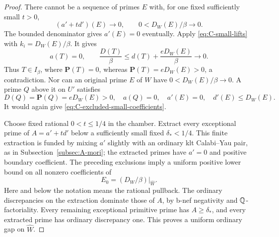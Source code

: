 \begin{proof}
There cannot be a sequence of primes $E$ with, for one fixed sufficiently
small $t>0$,
\begin{equation}\label{eq:C-excluded-small-coefficients}
 (a'+td')(E)\longrightarrow0,
 \qquad 0<D_W(E)/\beta\longrightarrow0.
\end{equation}
The bounded denominator gives $a'(E)=0$ eventually.  Apply
\eqref{eq:C-small-lifts} with $k_i=D_W(E)/\beta$.  It gives
\[
 a(T)=0,\qquad
 \frac{D(T)}{\beta}\leq d(T)+\frac{eD_W(E)}{\beta}\longrightarrow0.
\]
Thus $T\in I_\beta$, where $\mathbf P(T)=0$, whereas
$\mathbf P(T)=eD_W(E)>0$, a contradiction.  Nor can an original prime
$E$ of $W$ have $0<D_W(E)/\beta\to0$.  A prime $Q$ above it on $U'$
satisfies
\[
 D(Q)=\mathbf P(Q)=eD_W(E)>0,\quad a(Q)=0,
 \quad a'(E)=0,\quad d'(E)\leq D_W(E).
\]
It would again give \eqref{eq:C-excluded-small-coefficients}.

Choose fixed rational $0<t\leq1/4$ in the chamber.  Extract every
exceptional prime of $A=a'+td'$ below a sufficiently small fixed
$\delta_*<1/4$.  This finite extraction is funded by mixing $a'$
slightly with an ordinary klt Calabi--Yau pair, as in
Subsection~\ref{subsec:A-mori}; the extracted primes have $a'=0$ and
positive boundary coefficient.  The preceding exclusions imply a
uniform positive lower bound on all nonzero coefficients of
\[
                 E_0=(D_W/\beta)|_{\widehat W}.
\]
Here and below the notation means the rational pullback.  The ordinary
discrepancies on the extraction dominate those of $A$, by b-nef
negativity and $\mathbb Q$-factoriality.  Every remaining exceptional primitive
prime has $A\geq\delta_*$, and every extracted prime has ordinary
discrepancy one.  This proves a uniform ordinary gap on $\widehat W$.


\end{proof}
